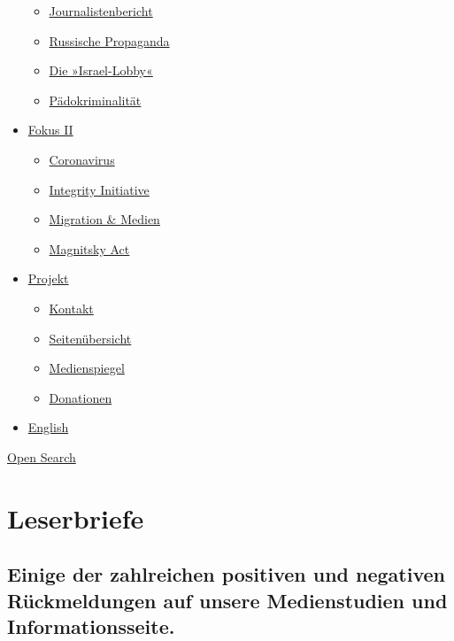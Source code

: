 \begin{itemize}
  \begin{itemize}
  \tightlist
  \item
    \href{https://swprs.org/bericht-eines-journalisten/}{Journalistenbericht}
  \item
    \href{https://swprs.org/russische-propaganda/}{Russische Propaganda}
  \item
    \href{https://swprs.org/die-israel-lobby-fakten-und-mythen/}{Die
    »Israel-Lobby«}
  \item
    \href{https://swprs.org/geopolitik-und-paedokriminalitaet/}{Pädokriminalität}
  \end{itemize}
\item
  \href{https://swprs.org/migration-und-medien/}{Fokus II}

  \begin{itemize}
  \tightlist
  \item
    \href{https://swprs.org/covid-19-hinweis-ii/}{Coronavirus}
  \item
    \href{https://swprs.org/die-integrity-initiative/}{Integrity
    Initiative}
  \item
    \href{https://swprs.org/migration-und-medien/}{Migration \& Medien}
  \item
    \href{https://swprs.org/der-fall-magnitsky/}{Magnitsky Act}
  \end{itemize}
\item
  \href{https://swprs.org/kontakt/}{Projekt}

  \begin{itemize}
  \tightlist
  \item
    \href{https://swprs.org/kontakt/}{Kontakt}
  \item
    \href{https://swprs.org/uebersicht/}{Seitenübersicht}
  \item
    \href{https://swprs.org/medienspiegel/}{Medienspiegel}
  \item
    \href{https://swprs.org/donationen/}{Donationen}
  \end{itemize}
\item
  \href{https://swprs.org/contact/}{English}
\end{itemize}

\protect\hyperlink{}{Open Search}

\hypertarget{leserbriefe}{%
\section{Leserbriefe}\label{leserbriefe}}

\hypertarget{einige-der-zahlreichen-positiven-und-negativen-ruxfcckmeldungen-auf-unsere-medienstudien-und-informationsseite}{%
\subsection{Einige der zahlreichen positiven und negativen
Rück­mel­dungen auf unsere Medien­studien und
Informations­seite.}\label{einige-der-zahlreichen-positiven-und-negativen-ruxfcckmeldungen-auf-unsere-medienstudien-und-informationsseite}}

